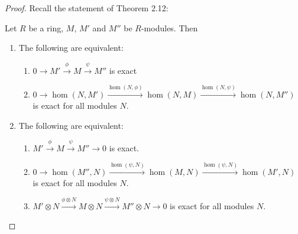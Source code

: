 \begin{proof}
Recall the statement of Theorem 2.12:
\begin{theorem*}
Let $R$ be a ring, $M$, $M'$ and $M''$ be $R$-modules. Then
\begin{enumerate}[noitemsep,label=(\alph*)]
\item The following are equivalent:
\begin{enumerate}[noitemsep,label=(\arabic*)]
\item $\displaystyle 0\xrightarrow{}
  M'\xrightarrow{\phi}M\xrightarrow{\psi}M''$
  is exact
\item $\displaystyle
  0\xrightarrow{}\hom(N,M')\xrightarrow{\hom(N,\phi)}\hom(N,M)\xrightarrow{\hom(N,\psi)}\hom(N,M'')$
  is exact for all modules $N$.
\end{enumerate}
\item The following are equivalent:
\begin{enumerate}[noitemsep,label=(\arabic*)]
\item $\displaystyle
  M'\xrightarrow{\phi}M\xrightarrow{\psi}M''\xrightarrow{}
  0$ is exact.
\item $\displaystyle
  0\xrightarrow{}\hom(M'',N)\xrightarrow{\hom(\psi,N)}\hom(M,N)\xrightarrow{\hom(\psi,N)}\hom(M',N)$
  is exact for all modules $N$.
\item $\displaystyle M'\otimes N\xrightarrow{\phi\otimes
    N}M\otimes N\xrightarrow{\psi\otimes
    N}M''\otimes N\xrightarrow{} 0$ is exact
  for all modules $N$.
\end{enumerate}
\end{enumerate}
\end{theorem*}
\end{proof}

